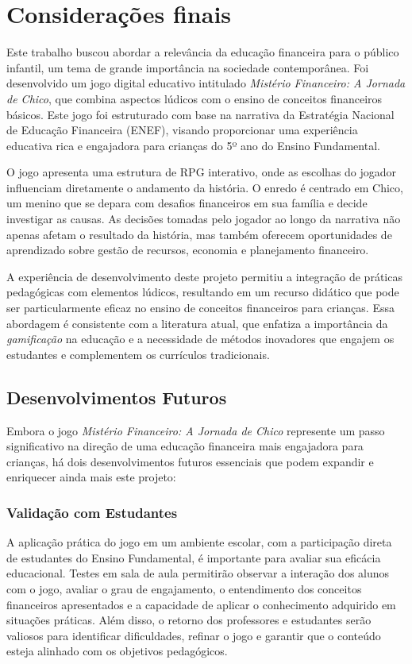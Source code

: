 \chapter{Considerações finais}

Este trabalho buscou abordar a relevância da educação financeira para o público infantil, um tema de grande importância na sociedade contemporânea. Foi desenvolvido um jogo digital educativo intitulado \textit{Mistério Financeiro: A Jornada de Chico}, que combina aspectos lúdicos com o ensino de conceitos financeiros básicos. Este jogo foi estruturado com base na narrativa da Estratégia Nacional de Educação Financeira (ENEF), visando proporcionar uma experiência educativa rica e engajadora para crianças do 5º ano do Ensino Fundamental.

O jogo apresenta uma estrutura de RPG interativo, onde as escolhas do jogador influenciam diretamente o andamento da história. O enredo é centrado em Chico, um menino que se depara com desafios financeiros em sua família e decide investigar as causas. As decisões tomadas pelo jogador ao longo da narrativa não apenas afetam o resultado da história, mas também oferecem oportunidades de aprendizado sobre gestão de recursos, economia e planejamento financeiro.

A experiência de desenvolvimento deste projeto permitiu a integração de práticas pedagógicas com elementos lúdicos, resultando em um recurso didático que pode ser particularmente eficaz no ensino de conceitos financeiros para crianças. Essa abordagem é consistente com a literatura atual, que enfatiza a importância da \textit{gamificação} na educação e a necessidade de métodos inovadores que engajem os estudantes e complementem os currículos tradicionais.

\section{Desenvolvimentos Futuros}
Embora o jogo \textit{Mistério Financeiro: A Jornada de Chico} represente um passo significativo na direção de uma educação financeira mais engajadora para crianças, há dois desenvolvimentos futuros essenciais que podem expandir e enriquecer ainda mais este projeto:

\subsection*{Validação com Estudantes}
A aplicação prática do jogo em um ambiente escolar, com a participação direta de estudantes do Ensino Fundamental, é importante para avaliar sua eficácia educacional. Testes em sala de aula permitirão observar a interação dos alunos com o jogo, avaliar o grau de engajamento, o entendimento dos conceitos financeiros apresentados e a capacidade de aplicar o conhecimento adquirido em situações práticas. Além disso, o retorno dos professores e estudantes serão valiosos para identificar dificuldades, refinar o jogo e garantir que o conteúdo esteja alinhado com os objetivos pedagógicos.


